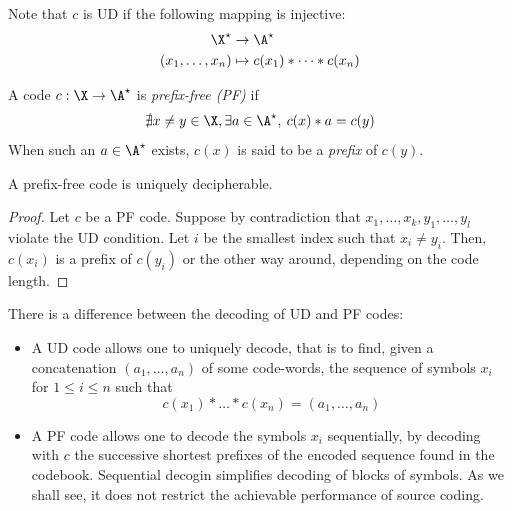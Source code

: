 \documentclass[toc, titlepaged]{../cs-classes/cs-classes}
\begin{document}
\begin{remark}
    Note that $c$ is UD if the following mapping is injective:
    \begin{equation*}
        \begin{aligned}
            \X^\star&\to\A^\star\\
            (x_1, \dots, x_n)&\mapsto c(x_1) * \dots * c(x_n)
        \end{aligned}
    \end{equation*}
\end{remark}

\begin{definition}
    A code $c: \X\to\A^\star$ is \emph{prefix-free (PF)} if
    \begin{equation*}
        \nexists x\neq y\in \X, \exists a\in\A^\star,\: c(x)*a=c(y)
    \end{equation*} 
    When such an $a\in\A^\star$ exists, $c(x)$ is said to be a \emph{prefix} of $c(y)$.
\end{definition}

\begin{lemma}[PF$\implies$ UD]
    A prefix-free code is uniquely decipherable.
\end{lemma}

\begin{proof}
    Let $c$ be a PF code. Suppose by contradiction that $x_1, \dots, x_k, y_1, \dots, y_l$ violate the UD condition. Let $i$ be the smallest index such that $x_i\neq y_i$. Then, $c(x_i)$ is a prefix of $c(y_i)$ or the other way around, depending on the code length.
\end{proof}

\begin{remark}
    There is a difference between the decoding of UD and PF codes:
    \begin{itemize}
        \item A UD code allows one to uniquely decode, that is to find, given a concatenation $(a_1, \dots, a_n)$ of some code-words, the sequence of symbols $x_i$ for $1\leq i\leq n$ such that
        \begin{equation*}
            c(x_1)*\dots *c(x_n)=(a_1, \dots, a_n)
        \end{equation*} 
        \item A PF code allows one to decode the symbols $x_i$ sequentially, by decoding with $c$ the successive shortest prefixes of the encoded sequence found in the codebook. Sequential decogin simplifies decoding of blocks of symbols. As we shall see, it does not restrict the achievable performance of source coding.
    \end{itemize}
\end{remark}
\end{document}
